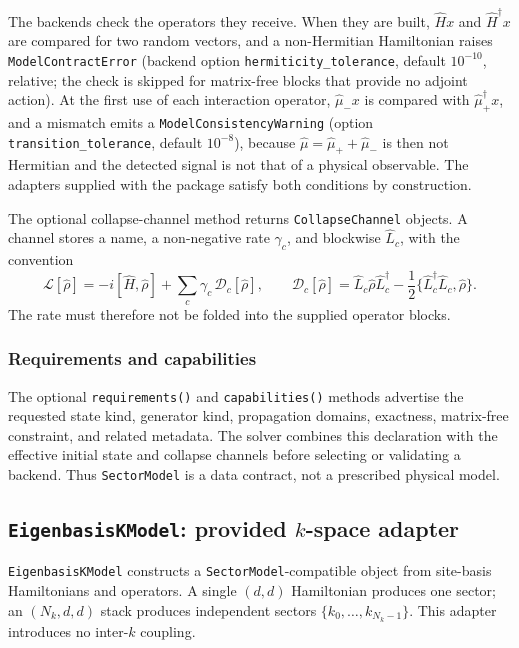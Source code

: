 \documentclass[11pt]{article}
\begin{document}
The backends check the operators they receive. When they are built, $\hat H x$ and $\hat H^\dagger x$ are compared for two random vectors, and a non-Hermitian Hamiltonian raises \texttt{ModelContractError} (backend option \texttt{hermiticity\_tolerance}, default $10^{-10}$, relative; the check is skipped for matrix-free blocks that provide no adjoint action). At the first use of each interaction operator, $\hat\mu_-x$ is compared with $\hat\mu_+^\dagger x$, and a mismatch emits a \texttt{ModelConsistencyWarning} (option \texttt{transition\_tolerance}, default $10^{-8}$), because $\hat\mu=\hat\mu_++\hat\mu_-$ is then not Hermitian and the detected signal is not that of a physical observable. The adapters supplied with the package satisfy both conditions by construction.

The optional collapse-channel method returns \texttt{CollapseChannel} objects. A channel stores a name, a non-negative rate $\gamma_c$, and blockwise $\hat{L}_c$, with the convention
\begin{equation}
    \mathcal{L}[\hat{\rho}]=-i[\hat{H},\hat{\rho}]+\sum_c\gamma_c\,\mathcal{D}_c[\hat{\rho}],
    \qquad
    \mathcal{D}_c[\hat{\rho}]=\hat{L}_c\hat{\rho} \hat{L}_c^\dagger-\frac{1}{2}
    \{\hat{L}_c^\dagger \hat{L}_c,\hat{\rho}\}.
\end{equation}
The rate must therefore not be folded into the supplied operator blocks.

\subsubsection{Requirements and capabilities}

The optional \texttt{requirements()} and \texttt{capabilities()} methods advertise the requested state kind, generator kind, propagation domains, exactness, matrix-free constraint, and related metadata. The solver combines this declaration with the effective initial state and collapse channels before selecting or validating a backend. Thus \texttt{SectorModel} is a data contract, not a prescribed physical model.





\subsection{\texttt{EigenbasisKModel}: provided $k$-space adapter}

\noindent \texttt{EigenbasisKModel} constructs a \texttt{SectorModel}-compatible object from site-basis Hamiltonians and operators. A single $(d,d)$ Hamiltonian produces one sector; an $(N_k,d,d)$ stack produces independent sectors $\{k_0,\ldots,k_{N_k-1}\}$. This adapter introduces no inter-$k$ coupling.
\end{document}
